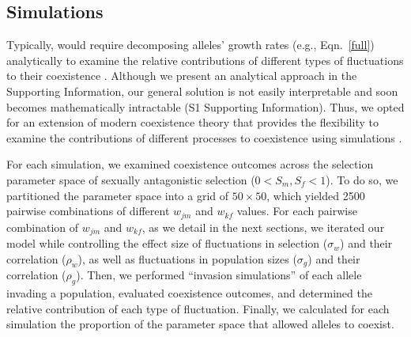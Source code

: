 \documentclass[12pt]{article}
\begin{document}
\subsection*{Simulations}

Typically,  would require decomposing alleles' growth rates (e.g., Eqn.~\ref{full}) analytically to examine the relative contributions of different types of fluctuations to their coexistence \citep{barabas_chessons_2018}. Although we present an analytical approach in the Supporting Information, our general solution is not easily interpretable and soon becomes mathematically intractable (S1 Supporting Information). Thus, we opted for an extension of modern coexistence theory that provides the flexibility to examine the contributions of different processes to coexistence using simulations \citep{ellner_expanded_2019, shoemaker2020}.



For each simulation, we examined coexistence outcomes across the selection parameter space of sexually antagonistic selection ($0 < S_{m}, S_{f} < 1$). To do so, we partitioned the parameter space into a grid of $50 \times 50$, which yielded 2500 pairwise combinations of different $w_{jm}$ and $w_{kf}$ values. For each pairwise combination of $w_{jm}$ and $w_{kf}$, as we detail in the next sections, we iterated our model while controlling the effect size of  fluctuations in selection ($\sigma_{w}$) and their correlation ($\rho_{w}$), as well as fluctuations in population sizes ($\sigma_{g}$) and their correlation ($\rho_{g}$). Then, we performed ``invasion simulations''  of each allele invading a population, evaluated coexistence outcomes, and determined the relative contribution of each type of fluctuation. Finally, we calculated for each simulation the proportion of the parameter space that allowed alleles to coexist.
\end{document}
